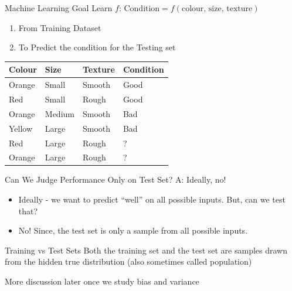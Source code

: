 \documentclass[dvipsnames]{beamer}
\begin{document}
\begin{frame}{Machine Learning Goal}
Learn $f$: 		$\text{Condition} = f(\text{colour, size, texture})$

\begin{enumerate}
	\item \pause From Training Dataset
	\item \pause To Predict the condition for the Testing set
\end{enumerate}

\begin{table}[]
	\begin{tabular}{|l|l|l||l|}
		\hline 
		
		\textbf{Colour} & \textbf{Size} & \textbf{Texture} & \textbf{Condition} \\ \hline 
		Orange & Small & Smooth  & Good      \\
		Red    & Small  & Rough  & Good \\
		Orange & Medium & Smooth & Bad \\
		Yellow & Large  & Smooth & Bad \\ \hline
		Red    & Large  & Rough  & ? \\
		Orange &  Large & Rough  & ? \\ \hline          
	\end{tabular}
\end{table}
\end{frame}

\begin{frame}{Can We Judge Performance Only on Test Set?}
A: Ideally, no!

\begin{itemize}
	\item \pause Ideally - we want to predict ``well'' on all possible inputs. But, can we test that?
	\item \pause No! Since, the test set is only a sample from all possible inputs.
\end{itemize}

\end{frame}

\begin{frame}{Training vs Test Sets}
Both the training set and the test set are samples drawn from the hidden true distribution (also sometimes called population)

\pause More discussion later once we study bias and variance
\end{frame}
\end{document}
